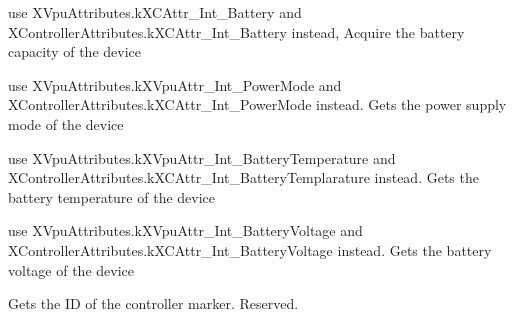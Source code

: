 \begin{DoxyRefList}
\item[\label{deprecated__deprecated000012}%
\Hypertarget{deprecated__deprecated000012}%
Member \mbox{\hyperlink{class_ximmerse_1_1_input_system_1_1_x_device_plugin_ab7f817a86e5b3af956089fb089b7d0c3a9ed8e6b6a8515241b17fb95209e7c75a}{Ximmerse.Input\+System.X\+Device\+Plugin.k\+X\+Act\+\_\+\+Get\+Int\+\_\+\+Battery}} ]use X\+Vpu\+Attributes.\+k\+X\+C\+Attr\+\_\+\+Int\+\_\+\+Battery and X\+Controller\+Attributes.\+k\+X\+C\+Attr\+\_\+\+Int\+\_\+\+Battery instead, Acquire the battery capacity of the device  
\item[\label{deprecated__deprecated000013}%
\Hypertarget{deprecated__deprecated000013}%
Member \mbox{\hyperlink{class_ximmerse_1_1_input_system_1_1_x_device_plugin_ab7f817a86e5b3af956089fb089b7d0c3a56b74811e99a4f7a98b7c57d9f8bc27e}{Ximmerse.Input\+System.X\+Device\+Plugin.k\+X\+Act\+\_\+\+Get\+Int\+\_\+\+Battery\+Mode}} ]use X\+Vpu\+Attributes.\+k\+X\+Vpu\+Attr\+\_\+\+Int\+\_\+\+Power\+Mode and X\+Controller\+Attributes.\+k\+X\+C\+Attr\+\_\+\+Int\+\_\+\+Power\+Mode instead. Gets the power supply mode of the device  
\item[\label{deprecated__deprecated000015}%
\Hypertarget{deprecated__deprecated000015}%
Member \mbox{\hyperlink{class_ximmerse_1_1_input_system_1_1_x_device_plugin_ab7f817a86e5b3af956089fb089b7d0c3a376ad4b439fe36819f0642463bf221fa}{Ximmerse.Input\+System.X\+Device\+Plugin.k\+X\+Act\+\_\+\+Get\+Int\+\_\+\+Battery\+Temperature}} ]use X\+Vpu\+Attributes.\+k\+X\+Vpu\+Attr\+\_\+\+Int\+\_\+\+Battery\+Temperature and X\+Controller\+Attributes.\+k\+X\+C\+Attr\+\_\+\+Int\+\_\+\+Battery\+Templarature instead. Gets the battery temperature of the device  
\item[\label{deprecated__deprecated000014}%
\Hypertarget{deprecated__deprecated000014}%
Member \mbox{\hyperlink{class_ximmerse_1_1_input_system_1_1_x_device_plugin_ab7f817a86e5b3af956089fb089b7d0c3a9cbbd8f58c423e1433031eb9ed4dbb94}{Ximmerse.Input\+System.X\+Device\+Plugin.k\+X\+Act\+\_\+\+Get\+Int\+\_\+\+Battery\+Voltage}} ]use X\+Vpu\+Attributes.\+k\+X\+Vpu\+Attr\+\_\+\+Int\+\_\+\+Battery\+Voltage and X\+Controller\+Attributes.\+k\+X\+C\+Attr\+\_\+\+Int\+\_\+\+Battery\+Voltage instead. Gets the battery voltage of the device  
\item[\label{deprecated__deprecated000010}%
\Hypertarget{deprecated__deprecated000010}%
Member \mbox{\hyperlink{class_ximmerse_1_1_input_system_1_1_x_device_plugin_ab7f817a86e5b3af956089fb089b7d0c3a156868998068c09a8c795ea03e1bc8be}{Ximmerse.Input\+System.X\+Device\+Plugin.k\+X\+Act\+\_\+\+Get\+Int\+\_\+\+Blob\+ID}} ]Gets the ID of the controller marker. Reserved.  

\end{DoxyRefList}
